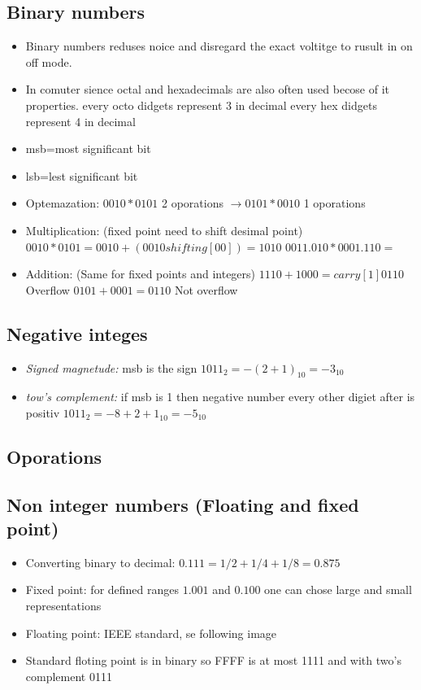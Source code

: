 \subsection{Binary numbers}
\begin{itemize}
\item  Binary numbers reduses noice and disregard the exact voltitge to rusult in on off mode.
\item  In comuter sience octal and hexadecimals are also often used becose of it properties.
  every octo didgets represent 3 in decimal
  every hex didgets represent 4 in decimal
\item  msb=most significant bit
\item  lsb=lest significant bit
\item  Optemazation: $0010*0101$  2 oporations $\to 0101*0010$  1 oporations
\item  Multiplication: (fixed point need to shift desimal point)
  $0010 * 0101 = 0010 + (0010 shifting[00]) = 1010$
  $0011.010 * 0001.110 = $
\item  Addition: (Same for fixed points and integers)
  $1110+1000= carry[1] 0110$ Overflow
  $0101+0001= 0110$ Not overflow
\end{itemize}

\subsection{Negative integes}
\begin{itemize}
\item  \emph{Signed magnetude:} msb is the sign
  ${1011}_2 = {-(2+1)}_{10} = {-3}_{10}$
\item  \emph{tow's complement:} if msb is 1 then negative number every other digiet after is positiv
  ${1011}_2 = {-8 +2 +1}_{10} = {-5}_{10}$
\end{itemize}


\subsection{Oporations}

\subsection{Non integer numbers (Floating and fixed point)}
\begin{itemize}
\item  Converting binary to decimal:
  $0.111 = 1/2 + 1/4 + 1/8= 0.875$
\item  Fixed point: for defined ranges $1.001$ and $0.100$ one can chose large and small representations
\item  Floating point:  IEEE standard, se following image
\item  Standard floting point is in binary so FFFF is at most 1111 and with two's complement  0111
\end{itemize}

